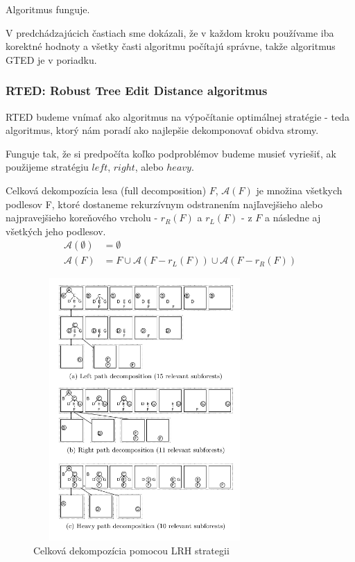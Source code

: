 \begin{dusl}
  Algoritmus funguje.
\end{dusl}

\begin{dukaz}
  V predchádzajúcich častiach sme dokázali, že v každom kroku používame iba korektné hodnoty a
  všetky časti algoritmu počítajú správne, takže algoritmus GTED je v poriadku.
\end{dukaz}


\subsubsection{RTED: Robust Tree Edit Distance algoritmus}

RTED budeme vnímať ako algoritmus na výpočítanie optimálnej stratégie - teda algoritmus,
ktorý nám poradí ako najlepšie dekomponovať obidva stromy.

Funguje tak, že si predpočíta koľko podproblémov budeme musieť vyriešiť, ak použijeme stratégiu
$left$, $right$, alebo $heavy$.

\begin{definice}
	Celková dekompozícia lesa (full decomposition) $F$, $\mathcal{A}(F)$ je množina
	všetkych podlesov F, ktoré dostaneme rekurzívnym odstranením najľavejšieho
	alebo najpravejšieho koreňového vrcholu - $r_{R}(F)$ a $r_{L}(F)$ - z $F$
	a následne aj všetkých jeho podlesov.
	\begin{align*}
		\mathcal{A}(\emptyset) &= \emptyset
		\\
		\mathcal{A}(F) &= {F} \cup \mathcal{A}(F - r_{L}(F)) \cup \mathcal{A}(F - r_{R}(F))
	\end{align*}
\end{definice}

\begin{figure}[H]
\centering
\includegraphics[width=85mm, height=100mm]{../img/LRH_decomposition.png}
\caption{Celková dekompozícia pomocou LRH strategii}
\label{obr:LRH_decomposition}
\end{figure}

